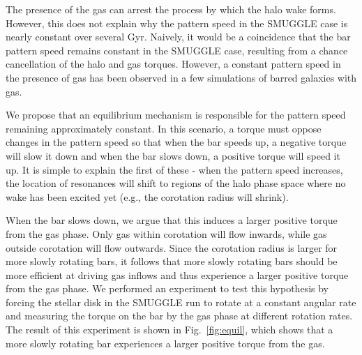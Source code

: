 \documentclass{natureprintstyle}
\begin{document}
The presence of the gas can arrest the process by which the halo wake forms.
However, this does not explain why the pattern speed in the SMUGGLE case is
nearly constant over several Gyr. Naively, it would be a coincidence that the
bar pattern speed remains constant in the SMUGGLE case, resulting from a
chance cancellation of the halo and gas torques. However, a constant pattern
speed in the presence of gas has been observed in a few simulations of barred
galaxies with gas.\cite{1993AA...268...65F, 2010ApJ...719.1470V}

We propose that an equilibrium mechanism is responsible for the pattern speed
remaining approximately constant. In this scenario, a torque must oppose
changes in the pattern speed so that when the bar speeds up, a negative torque
will slow it down and when the bar slows down, a positive torque will speed it
up. It is simple to explain the first of these - when the pattern speed
increases, the location of resonances will shift to regions of the halo phase
space where no wake has been excited yet (e.g., the corotation radius will
shrink).

When the bar slows down, we argue that this induces a larger positive torque
from the gas phase. Only gas within corotation will flow inwards, while gas
outside corotation will flow outwards.\cite{2011MNRAS.415.1027H} Since the corotation radius is larger
for more slowly rotating bars, it follows that more slowly rotating bars
should be more efficient at driving gas inflows and thus experience a larger
positive torque from the gas phase. We performed an experiment to test this
hypothesis by forcing the stellar disk in the SMUGGLE run to rotate at a
constant angular rate and measuring the torque on the bar by the gas phase at
different rotation rates. The result of this experiment is shown in
Fig.~\ref{fig:equil}, which shows that a more slowly rotating bar experiences
a larger positive torque from the gas.
\end{document}
